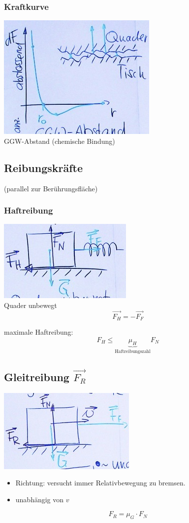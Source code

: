 \subsubsection{Kraftkurve}
\includegraphics{Bild27} \\
GGW-Abstand (chemische Bindung)

\subsection{Reibungskräfte}
(parallel zur Berührungsfläche)

\subsubsection{Haftreibung}
\includegraphics{Bild28} \\
Quader unbewegt \\
\[ \vec{F_H} = -\vec{F_F} \]

maximale Haftreibung:
\[ F_H \leq \underbrace{\mu_H}_{\text{Haftreibungszahl}} F_N \]

\subsection{Gleitreibung \texorpdfstring{$\vec{F_R}$}{F_R}}
\includegraphics{Bild29}
\begin{itemize}
	\item Richtung: versucht immer Relativbewegung zu bremsen.
	\item unabhängig von $v$
\end{itemize}
\[ F_R = \mu_G \cdot F_N \]


